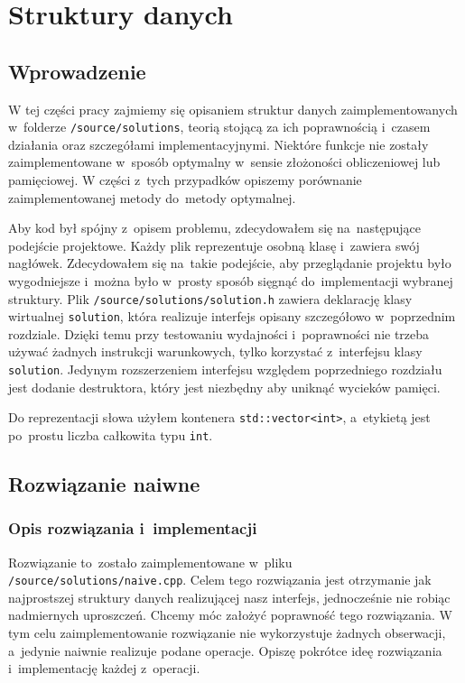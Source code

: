 \documentclass[declaration,shortabstract]{iithesis}
\theoremstyle{definition} \newtheorem{definition}{Definicja}[chapter]
\theoremstyle{remark} \newtheorem{remark}[definition]{Obserwacja}
\theoremstyle{plain} \newtheorem{theorem}[definition]{Twierdzenie}
\theoremstyle{remark} \newtheorem{example}{Przykład}[definition]
\theoremstyle{plain} \newtheorem{lemma}[definition]{Lemat}
\begin{document}
\chapter{Struktury danych}

\section{Wprowadzenie}

W tej części pracy zajmiemy się opisaniem struktur danych zaimplementowanych w~folderze \texttt{/source/solutions}, teorią stojącą za ich poprawnością i~czasem działania oraz szczegółami implementacyjnymi. Niektóre funkcje nie zostały zaimplementowane w~sposób optymalny w~sensie złożoności obliczeniowej lub pamięciowej. W części z~tych przypadków opiszemy porównanie zaimplementowanej metody do~metody optymalnej.

Aby kod był spójny z~opisem problemu, zdecydowałem się na~następujące podejście projektowe. Każdy plik reprezentuje osobną klasę i~zawiera swój nagłówek. Zdecydowałem się na~takie podejście, aby przeglądanie projektu było wygodniejsze i~można było w~prosty sposób sięgnąć do~implementacji wybranej struktury. Plik \texttt{/source/solutions/solution.h} zawiera deklarację klasy wirtualnej \texttt{solution}, która realizuje interfejs opisany szczegółowo w~poprzednim rozdziale. Dzięki temu przy testowaniu wydajności i~poprawności nie trzeba używać żadnych instrukcji warunkowych, tylko korzystać z~interfejsu klasy \texttt{solution}. Jedynym rozszerzeniem interfejsu względem poprzedniego rozdziału jest dodanie destruktora, który jest niezbędny aby uniknąć wycieków pamięci.

Do reprezentacji słowa użyłem kontenera \texttt{std::vector<int>}, a~etykietą jest po~prostu liczba całkowita typu \texttt{int}.

\section{Rozwiązanie naiwne}

\subsection{Opis rozwiązania i~implementacji}

Rozwiązanie to~zostało zaimplementowane w~pliku \texttt{/source/solutions/naive.cpp}. Celem tego rozwiązania jest otrzymanie jak najprostszej struktury danych realizującej nasz interfejs, jednocześnie nie robiąc nadmiernych uproszczeń. Chcemy móc założyć poprawność tego rozwiązania. W tym celu zaimplementowanie rozwiązanie nie wykorzystuje żadnych obserwacji, a~jedynie naiwnie realizuje podane operacje. Opiszę pokrótce ideę rozwiązania i~implementację każdej z~operacji.
\end{document}
